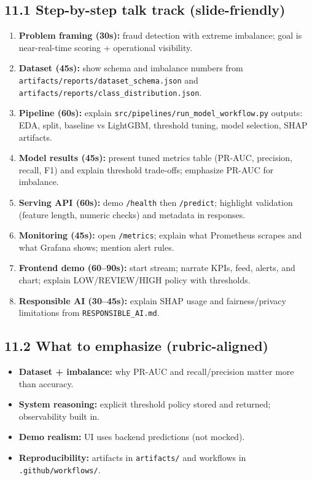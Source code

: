 \documentclass[11pt]{article}
\newcommand{\code}[1]{\texttt{#1}}
\begin{document}
\subsection*{11.1 Step-by-step talk track (slide-friendly)}
\begin{enumerate}[leftmargin=1.5em]
  \item \textbf{Problem framing (30s):} fraud detection with extreme imbalance; goal is near-real-time scoring + operational visibility.
  \item \textbf{Dataset (45s):} show schema and imbalance numbers from \code{artifacts/reports/dataset\_schema.json} and \code{artifacts/reports/class\_distribution.json}.
  \item \textbf{Pipeline (60s):} explain \code{src/pipelines/run\_model\_workflow.py} outputs: EDA, split, baseline vs LightGBM, threshold tuning, model selection, SHAP artifacts.
  \item \textbf{Model results (45s):} present tuned metrics table (PR-AUC, precision, recall, F1) and explain threshold trade-offs; emphasize PR-AUC for imbalance.
  \item \textbf{Serving API (60s):} demo \code{/health} then \code{/predict}; highlight validation (feature length, numeric checks) and metadata in responses.
  \item \textbf{Monitoring (45s):} open \code{/metrics}; explain what Prometheus scrapes and what Grafana shows; mention alert rules.
  \item \textbf{Frontend demo (60–90s):} start stream; narrate KPIs, feed, alerts, and chart; explain LOW/REVIEW/HIGH policy with thresholds.
  \item \textbf{Responsible AI (30–45s):} explain SHAP usage and fairness/privacy limitations from \code{RESPONSIBLE\_AI.md}.
\end{enumerate}

\subsection*{11.2 What to emphasize (rubric-aligned)}
\begin{itemize}
  \item \textbf{Dataset + imbalance:} why PR-AUC and recall/precision matter more than accuracy.
  \item \textbf{System reasoning:} explicit threshold policy stored and returned; observability built in.
  \item \textbf{Demo realism:} UI uses backend predictions (not mocked).
  \item \textbf{Reproducibility:} artifacts in \code{artifacts/} and workflows in \code{.github/workflows/}.
\end{itemize}
\end{document}
